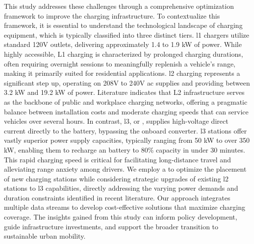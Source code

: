 This study addresses these challenges through a comprehensive optimization framework to improve the   charging infrastructure. To contextualize this framework, it is essential to understand the technological landscape of  charging equipment, which is typically classified into three distinct tiers. \gls{l1} chargers utilize standard 120V  outlets, delivering approximately 1.4 to 1.9 kW of power. While highly accessible, L1 charging is characterized by prolonged charging durations, often requiring overnight sessions to meaningfully replenish a vehicle's range, making it primarily suited for residential applications. \gls{l2} charging represents a significant step up, operating on 208V to 240V \gls{ac} supplies and providing between 3.2 kW and 19.2 kW of power. Literature indicates that L2 infrastructure serves as the backbone of public and workplace charging networks, offering a pragmatic balance between installation costs and moderate charging speeds that can service vehicles over several hours. In contrast, \gls{l3}, or , supplies high-voltage direct current directly to the battery, bypassing the onboard converter. \gls{l3} stations offer vastly superior power supply capacities, typically ranging from 50 kW to over 350 kW, enabling them to recharge an  battery to 80\% capacity in under 30 minutes. This rapid charging speed is critical for facilitating long-distance travel and alleviating range anxiety among drivers. We employ a  to optimize the placement of new charging stations while considering strategic upgrades of existing \gls{l2} stations to \gls{l3} capabilities, directly addressing the varying power demands and duration constraints identified in recent literature. Our approach integrates multiple data streams to develop cost-effective solutions that maximize charging coverage. The insights gained from this study can inform policy development, guide infrastructure investments, and support the broader transition to sustainable urban mobility.
